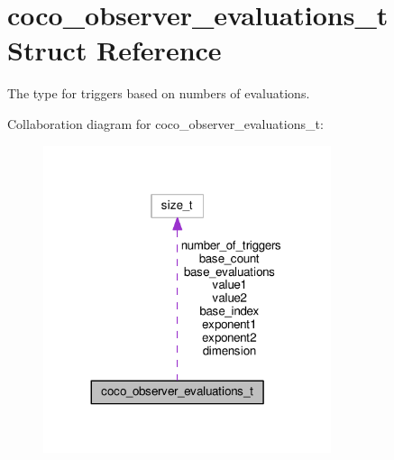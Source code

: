 \hypertarget{structcoco__observer__evaluations__t}{}\section{coco\+\_\+observer\+\_\+evaluations\+\_\+t Struct Reference}
\label{structcoco__observer__evaluations__t}


The type for triggers based on numbers of evaluations.  




Collaboration diagram for coco\+\_\+observer\+\_\+evaluations\+\_\+t\+:\nopagebreak
\begin{figure}[H]
\begin{center}
\leavevmode
\includegraphics[width=239pt]{structcoco__observer__evaluations__t__coll__graph}
\end{center}
\end{figure}
